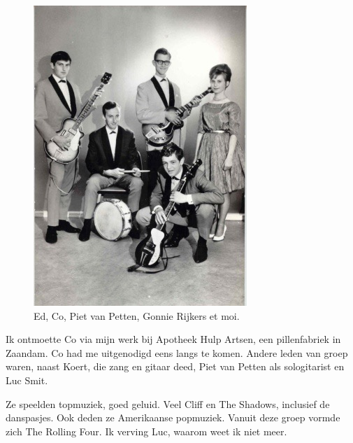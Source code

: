 \documentclass[10pt,twoside, openright]{memoir}
\begin{document}
\begin{figure}
\includegraphics[width=\textwidth]{img/ch26/rollingfour}
\caption*{\footnotesize Ed, Co, Piet van Petten, Gonnie Rijkers et moi.}
\end{figure}

Ik ontmoette Co via mijn werk bij Apotheek Hulp Artsen, een pillenfabriek in Zaandam. Co had me uitgenodigd eens langs te komen. Andere leden van groep waren, naast Koert, die zang en gitaar deed, Piet van Petten als sologitarist en Luc Smit.  

Ze speelden topmuziek, goed geluid. Veel Cliff en The Shadows, inclusief de danspasjes. Ook deden ze Amerikaanse popmuziek. Vanuit deze groep vormde zich The Rolling Four. Ik verving Luc, waarom weet ik niet meer.
\end{document}
